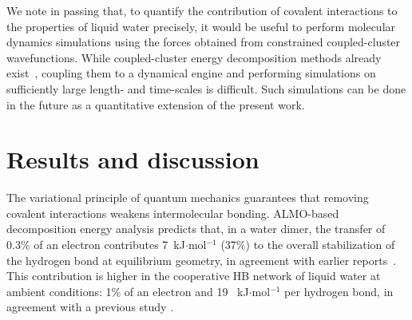 \documentclass[10pt,amsmath,twocolumn,aps,prl,superscriptaddress,floatfix]{revtex4-1}
\begin{document}
We note in passing that, to quantify the contribution of covalent interactions to the properties of liquid water precisely, it would be useful to perform molecular dynamics simulations using the forces obtained from constrained coupled-cluster wavefunctions. While coupled-cluster energy decomposition methods already exist~\cite{schneider2016decomposition,azar2012energy,azar2015similarity}, coupling them to a dynamical engine and performing simulations on sufficiently large length- and time-scales is difficult. Such simulations can be done in the future as a quantitative extension of the present work.


\section{Results and discussion}

The variational principle of quantum mechanics guarantees that removing covalent interactions weakens intermolecular bonding. 
ALMO-based decomposition energy analysis predicts that, in a water dimer, the transfer of 0.3\% of an electron contributes  7~kJ$\cdot$mol$^{-1}$ (37\%) to the overall stabilization of the hydrogen bond at equilibrium geometry, in agreement with earlier reports~\cite{stevens1987frozen,chen1996energy,piquemal2005csov,khaliullin2009electron}. This contribution is higher in the cooperative HB network of liquid water at ambient conditions: 1\% of an electron and 19 ~kJ$\cdot$mol$^{-1}$ per hydrogen bond, in agreement with a previous study \cite{kuhne2014nature}.
\end{document}
